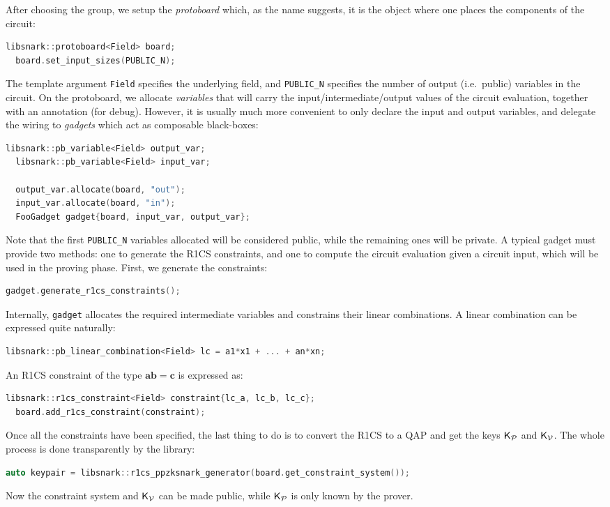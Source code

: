 After choosing the group, we setup the \emph{protoboard} which, as the 
name suggests, it is the object where one places the components of the circuit:
\begin{lstlisting}[language=C++]
  libsnark::protoboard<Field> board;
  board.set_input_sizes(PUBLIC_N);
\end{lstlisting}
The template argument \texttt{Field} specifies the underlying field, and \texttt{PUBLIC\_N} 
specifies the number of output (i.e.\ public) variables in the circuit.
On the protoboard, we allocate \emph{variables} that will carry the input/intermediate/output
values of the circuit evaluation, together with an annotation (for debug).
However, it is usually much more convenient to only declare the input and output variables, and 
delegate the wiring to \emph{gadgets} which act as composable black-boxes:
\begin{lstlisting}[language=C++]
  libsnark::pb_variable<Field> output_var;
  libsnark::pb_variable<Field> input_var;

  output_var.allocate(board, "out");
  input_var.allocate(board, "in");
  FooGadget gadget{board, input_var, output_var};
\end{lstlisting}
Note that the first \texttt{PUBLIC\_N} variables allocated will be considered public, while the 
remaining ones will be private.
A typical gadget must provide two methods: one to generate the R1CS constraints, and one to 
compute the circuit evaluation given a circuit input, which will be used in the proving phase.
First, we generate the constraints:
\begin{lstlisting}[language=C++]
  gadget.generate_r1cs_constraints();
\end{lstlisting}
Internally, \texttt{gadget} allocates the required intermediate variables and constrains their 
linear combinations. 
A linear combination can be expressed quite naturally:
\begin{lstlisting}[language=C++] 
  libsnark::pb_linear_combination<Field> lc = a1*x1 + ... + an*xn;
\end{lstlisting}
An R1CS constraint of the type \(\bm{ab} = \bm{c}\) is expressed as:
\begin{lstlisting}[language=C++]
  libsnark::r1cs_constraint<Field> constraint{lc_a, lc_b, lc_c};
  board.add_r1cs_constraint(constraint);
\end{lstlisting}
Once all the constraints have been specified, the last thing to do is to convert the R1CS to a 
QAP and get the keys \(\mathsf{K}_\mathcal{P} \) and \(\mathsf{K}_\mathcal{V} \).
The whole process is done transparently by the library:
\begin{lstlisting}[language=C++]
  auto keypair = libsnark::r1cs_ppzksnark_generator(board.get_constraint_system());
\end{lstlisting}
Now the constraint system and \(\mathsf{K}_\mathcal{V} \) can be made public, while \(\mathsf{K}_\mathcal{P} \) is only 
known by the prover. 


